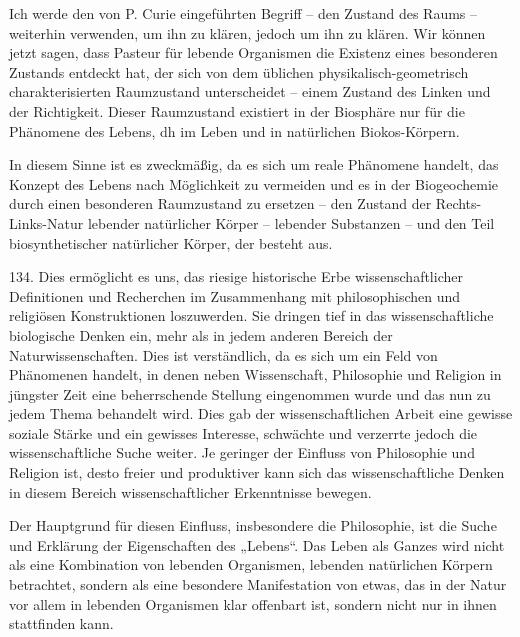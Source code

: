 \documentclass[11pt,a4paper]{book}
\begin{document}
Ich werde den von P. Curie eingeführten Begriff -- den Zustand des Raums -- weiterhin verwenden, um ihn zu klären, jedoch um ihn zu klären. Wir können jetzt sagen, dass Pasteur für lebende Organismen die Existenz eines besonderen Zustands entdeckt hat, der sich von dem üblichen physikalisch-geometrisch charakterisierten Raumzustand unterscheidet -- einem Zustand des Linken und der Richtigkeit. Dieser Raumzustand existiert in der Biosphäre nur für die Phänomene des Lebens, dh im Leben und in natürlichen Biokos-Körpern.



In diesem Sinne ist es zweckmäßig, da es sich um reale Phänomene handelt, das Konzept des Lebens nach Möglichkeit zu vermeiden und es in der Biogeochemie durch einen besonderen Raumzustand zu ersetzen -- den Zustand der Rechts-Links-Natur lebender natürlicher Körper -- lebender Substanzen -- und den Teil biosynthetischer natürlicher Körper, der besteht aus.



134. Dies ermöglicht es uns, das riesige historische Erbe wissenschaftlicher Definitionen und Recherchen im Zusammenhang mit philosophischen und religiösen Konstruktionen loszuwerden. Sie dringen tief in das wissenschaftliche biologische Denken ein, mehr als in jedem anderen Bereich der Naturwissenschaften. Dies ist verständlich, da es sich um ein Feld von Phänomenen handelt, in denen neben Wissenschaft, Philosophie und Religion in jüngster Zeit eine beherrschende Stellung eingenommen wurde und das nun zu jedem Thema behandelt wird. Dies gab der wissenschaftlichen Arbeit eine gewisse soziale Stärke und ein gewisses Interesse, schwächte und verzerrte jedoch die wissenschaftliche Suche weiter. Je geringer der Einfluss von Philosophie und Religion ist, desto freier und produktiver kann sich das wissenschaftliche Denken in diesem Bereich wissenschaftlicher Erkenntnisse bewegen.



Der Hauptgrund für diesen Einfluss, insbesondere die Philosophie, ist die Suche und Erklärung der Eigenschaften des „Lebens“. Das Leben als Ganzes wird nicht als eine Kombination von lebenden Organismen, lebenden natürlichen Körpern betrachtet, sondern als eine besondere Manifestation von etwas, das in der Natur vor allem in lebenden Organismen klar offenbart ist, sondern nicht nur in ihnen stattfinden kann.
\end{document}
